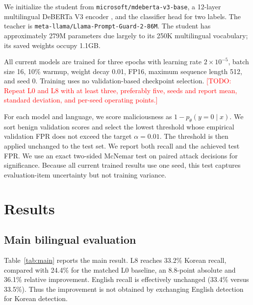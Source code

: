 \documentclass[10pt,twocolumn]{article}
\newcommand{\todo}[1]{\textcolor{red}{[TODO: #1]}}
\begin{document}
We initialize the student from \texttt{microsoft/mdeberta-v3-base}, a 12-layer
multilingual DeBERTa V3 encoder \cite{he2021debertav3}, and the classifier head
for two labels. The teacher is
\texttt{meta-llama/Llama-Prompt-Guard-2-86M}. The student has approximately 279M
parameters due largely to its 250K multilingual vocabulary; its saved weights
occupy 1.1GB.

All current models are trained for three epochs with learning rate
$2\times10^{-5}$, batch size 16, 10\% warmup, weight decay 0.01, FP16, maximum
sequence length 512, and seed 0. Training uses no validation-based checkpoint
selection. \todo{Repeat L0 and L8 with at least three, preferably five, seeds and
report mean, standard deviation, and per-seed operating points.}

For each model and language, we score maliciousness as $1-p_\theta(y=0\mid x)$.
We sort benign validation scores and select the lowest threshold whose empirical
validation FPR does not exceed the target $\alpha=0.01$. The threshold is then
applied unchanged to the test set. We report both recall and the achieved test
FPR. We use an exact two-sided McNemar test on paired attack decisions for
significance. Because all current trained results use one seed, this test
captures evaluation-item uncertainty but not training variance.

\section{Results}

\subsection{Main bilingual evaluation}

Table~\ref{tab:main} reports the main result. L8 reaches 33.2\% Korean recall,
compared with 24.4\% for the matched L0 baseline, an 8.8-point absolute and
36.1\% relative improvement. English recall is effectively unchanged
(33.4\% versus 33.5\%). Thus the improvement is not obtained by exchanging
English detection for Korean detection.
\end{document}

